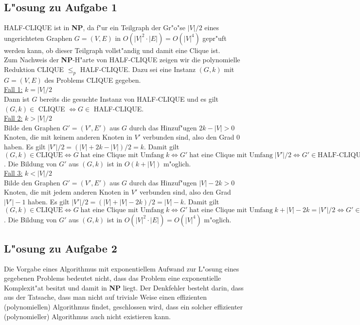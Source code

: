 \documentclass[10pt,oneside,onecolumn,a4paper,german,titlepage]{article}
\begin{document}
\newpage

\subsection*{L"osung zu Aufgabe 1}
HALF-CLIQUE ist in \textbf{NP}, da f"ur ein Teilgraph der Gr"o"se $|V|/2$ eines
ungerichteten Graphen $G = (V,E)$ in $O(|V|^2 \cdot |E|) = O(|V|^4)$ gepr"uft werden
kann, ob dieser Teilgraph vollst"andig und damit eine Clique ist.\\[4pt]
Zum Nachweis der \textbf{NP}-H"arte von HALF-CLIQUE zeigen wir die polynomielle
Reduktion CLIQUE $\leq_p$ HALF-CLIQUE. Dazu sei eine Instanz $(G,k)$ mit $G = (V,E)$
des Problems CLIQUE gegeben.\\
\underline{Fall 1:} $k = |V|/2$\\
Dann ist $G$ bereits die gesuchte Instanz von HALF-CLIQUE und es gilt $(G,k) \in$
CLIQUE $\Leftrightarrow G \in$ HALF-CLIQUE.\\
\underline{Fall 2:} $k > |V|/2$\\
Bilde den Graphen $G' = (V',E')$ aus $G$ durch das Hinzuf"ugen $2k - |V| > 0$ Knoten,
die mit keinem anderen Knoten in $V'$ verbunden sind, also den Grad 0 haben. Es gilt
$|V'|/2 = (|V| + 2k - |V|)/2 = k$. Damit gilt $(G,k) \in \mbox{CLIQUE}
\Leftrightarrow G \; \mbox{hat eine Clique mit Umfang} \; k
\Leftrightarrow G' \; \mbox{hat eine Clique mit Umfang} \; |V'|/2
\Leftrightarrow G' \in \mbox{HALF-CLIQUE}$.
Die Bildung von $G'$ aus $(G,k)$ ist in $O(k+|V|)$ m"oglich.\\
\underline{Fall 3:} $k < |V|/2$\\
Bilde den Graphen $G' = (V',E')$ aus $G$ durch das Hinzuf"ugen $|V| - 2k > 0$ Knoten,
die mit jedem anderen Knoten in $V'$ verbunden sind, also den Grad $|V'| - 1$ haben.
Es gilt $|V'|/2 = (|V| + |V| - 2k)/2 = |V| - k$. Damit gilt $(G,k) \in \mbox{CLIQUE}
\Leftrightarrow G \; \mbox{hat eine Clique mit Umfang} \; k
\Leftrightarrow G' \; \mbox{hat eine Clique mit Umfang} \; k + |V| - 2k = |V'|/2
\Leftrightarrow G' \in \mbox{HALF-CLIQUE}$.
Die Bildung von $G'$ aus $(G,k)$ ist in $O(|V|^2 \cdot |E|) = O(|V|^4)$ m"oglich.

\subsection*{L"osung zu Aufgabe 2}
Die Vorgabe eines Algorithmus mit exponentiellem Aufwand zur L"osung eines gegebenen
Problems bedeutet nicht, dass das Problem eine exponentielle Komplexit"at besitzt und
damit in \textbf{NP} liegt. Der Denkfehler besteht darin, dass aus der Tatsache, dass
man nicht auf triviale Weise einen effizienten (polynomiellen) Algorithmus findet,
geschlossen wird, dass ein solcher effizienter (polynomieller) Algorithmus auch nicht
existieren kann.
\end{document}
